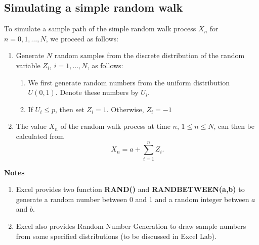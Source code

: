 \documentclass[
]{book}
\theoremstyle{definition}
\theoremstyle{definition}
\theoremstyle{definition}
\theoremstyle{definition}
\theoremstyle{remark}
\begin{document}
\hypertarget{simulating-a-simple-random-walk}{%
\subsection{Simulating a simple random walk}\label{simulating-a-simple-random-walk}}

To simulate a sample path of the simple random walk process \(X_n\) for
\(n = 0,1, \ldots, N\), we proceed as follows:

\begin{enumerate}
\def\labelenumi{\arabic{enumi}.}
\item
  Generate \(N\) random samples from the discrete distribution of the
  random variable \(Z_i\), \(i = 1,\ldots, N\), as follows:

  \begin{enumerate}
  \def\labelenumii{\arabic{enumii}.}
  \item
    We first generate random numbers from the uniform distribution
    \(U(0,1)\). Denote these numbers by \(U_i\).
  \item
    If \(U_i \le p\), then set \(Z_i = 1\). Otherwise, \(Z_i = -1\)
  \end{enumerate}
\item
  The value \(X_n\) of the random walk process at time \(n\),
  \(1 \le n \le N\), can then be calculated from
  \[X_n = a + \sum_{i=1}^n  Z_i.\]
\end{enumerate}

\textbf{Notes}

\begin{enumerate}
\def\labelenumi{\arabic{enumi}.}
\item
  Excel provides two function \textbf{RAND()} and \textbf{RANDBETWEEN(a,b)} to
  generate a random number between 0 and 1 and a random integer
  between \(a\) and \(b\).
\item
  Excel also provides Random Number Generation to draw sample numbers
  from some specified distributions (to be discussed in Excel Lab).
\end{enumerate}
\end{document}
